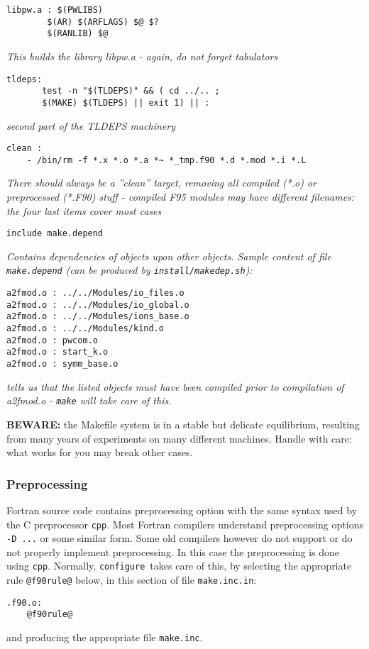 \documentclass[12pt,a4paper]{article}
\def\configure{\texttt{configure}}
\def\make.inc{\texttt{make.inc}}
\begin{document}
\begin{verbatim}
libpw.a : $(PWLIBS)
        $(AR) $(ARFLAGS) $@ $?
        $(RANLIB) $@
\end{verbatim}
{\em This builds the library libpw.a - again, do not forget tabulators}
\begin{verbatim}
tldeps:
       test -n "$(TLDEPS)" && ( cd ../.. ;
       $(MAKE) $(TLDEPS) || exit 1) || :
\end{verbatim}
{\em second part of the TLDEPS machinery}
\begin{verbatim}
clean :
	- /bin/rm -f *.x *.o *.a *~ *_tmp.f90 *.d *.mod *.i *.L
\end{verbatim}
{\em There should always be a ''clean'' target, removing all compiled (*.o)
or preprocessed (*.F90) stuff - compiled F95 modules may have different
filenames: the four last items cover most cases}
\begin{verbatim}
include make.depend
\end{verbatim}
{\em Contains dependencies of objects upon other objects. Sample
content of file {\tt make.depend} (can be produced by {\tt install/makedep.sh}):}
\begin{verbatim}
a2fmod.o : ../../Modules/io_files.o
a2fmod.o : ../../Modules/io_global.o
a2fmod.o : ../../Modules/ions_base.o
a2fmod.o : ../../Modules/kind.o
a2fmod.o : pwcom.o
a2fmod.o : start_k.o
a2fmod.o : symm_base.o
\end{verbatim}
{\em tells us that the listed objects must have been compiled
prior to compilation of a2fmod.o - {\tt make} will take care of this.}

{\bf BEWARE:} the Makefile system is in a stable but delicate equilibrium,
resulting from many years of experiments on many different machines.
Handle with care: what works for you may break other cases.

\subsubsection{Preprocessing}

\label{SubSec:CPP}
Fortran source code contains preprocessing option with
the same syntax used by the C preprocessor \texttt{cpp}.
Most Fortran compilers understand preprocessing options \texttt{-D ...}
or some similar form. Some old compilers however do not support
or do not properly implement preprocessing. In this case the
preprocessing is done using \texttt{cpp}.
Normally, \configure\ takes care of this, by selecting the
appropriate rule \texttt{@f90rule@} below, in this section
of file \texttt{make.inc.in}:
\begin{verbatim}
.f90.o:
	@f90rule@
\end{verbatim}
and producing the appropriate file \make.inc.
\end{document}
